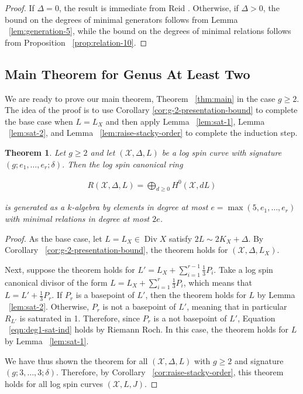 \documentclass{amsart}
\theoremstyle{plain}
\newtheorem{thm}{Theorem}[section]
\theoremstyle{definition}
\theoremstyle{remark}
\numberwithin{equation}{section}
\newcommand\ssec{\subsection}
\DeclareMathOperator\di{Div}
\newcommand\sx{\mathscr X}
\newcommand{\halfcan}{L}
\begin{document}
\begin{proof}
If $\Delta = 0$, the result is immediate from Reid \cite[Theorem 3.4]
{reid:infinitesimal}. Otherwise, if $\Delta > 0$, the bound on the
degrees of minimal generators follows from Lemma
~\ref{lem:generation-5}, while the bound on the degrees of minimal
relations follows from Proposition ~\ref{prop:relation-10}.
\end{proof}

\ssec{Main Theorem for Genus At Least Two}
\label{ssec:g-high-main}

We are ready to prove our main theorem, Theorem ~\ref{thm:main} in the case
$g \geq 2$. The idea of the proof is to use Corollary \ref{cor:g-2-presentation-bound} to 
complete the base case when $L = \halfcan_X$ and then apply Lemma
~\ref{lem:sat-1}, Lemma ~\ref{lem:sat-2}, and Lemma
~\ref{lem:raise-stacky-order} to complete the induction step.

\begin{thm}
\label{thm:g-high-main}
Let $g \geq 2$ and let $(\sx, \Delta, \halfcan)$ be a log spin curve 
with signature $(g; e_1, \ldots, e_r; \delta)$. Then the
log spin canonical ring

\begin{align*}
	R(\sx, \Delta, \halfcan) = \bigoplus_{d \geq 0} H^0(\sx, d L )
\end{align*}

\noindent
is generated as a $k$-algebra by elements in degree at most $e =
\max(5, e_1, \ldots, e_r)$ with minimal relations in degree at most $2e$.
\end{thm}

%

\begin{proof}
As the base case, let $\halfcan=\halfcan_X \in \di X$ satisfy $2\halfcan \sim 2 K_X + \Delta$.
By Corollary ~\ref{cor:g-2-presentation-bound}, the theorem holds for $(\sx, \Delta,
\halfcan_X)$. 

Next, suppose the theorem holds for $\halfcan' = \halfcan_X + \sum_{i=1}^{r-1} \frac{1}{3}P_i$. Take a log spin canonical divisor of the form $\halfcan = \halfcan_X + \sum_{i=1}^r \frac{1}{3} P_i$, which means that $\halfcan = \halfcan' + \frac{1}{3} P_r$.  If $P_r$ is a basepoint of $\halfcan'$, then the theorem holds for $\halfcan$ by Lemma ~\ref{lem:sat-2}.
Otherwise, $P_r$ is not a basepoint of $\halfcan'$, meaning that in particular $R_{\halfcan'}$ is saturated in 1.
Therefore, since $P_r$ is a not basepoint of $\halfcan'$, Equation
~\ref{eqn:deg1-sat-ind} holds by Riemann Roch.
In this case, the theorem holds for $\halfcan$ by Lemma ~\ref{lem:sat-1}.

We have thus shown the theorem for all $(\sx, \Delta, \halfcan)$ with $g\ge 2$ and signature $(g;3, \ldots, 3;\delta)$. Therefore, by Corollary 
~\ref{cor:raise-stacky-order}, this theorem 
holds for all log spin curves $(\sx, L, J)$. 
\end{proof}
\end{document}
